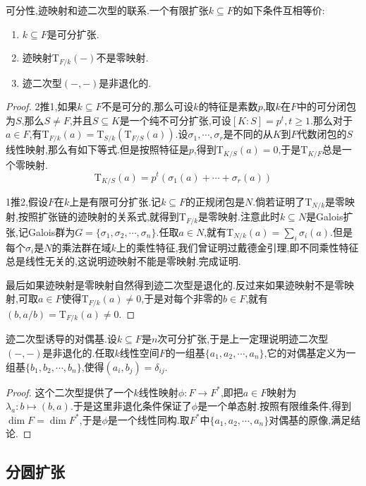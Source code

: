 可分性,迹映射和迹二次型的联系.一个有限扩张$k\subseteq F$的如下条件互相等价:
\begin{enumerate}
	\item $k\subseteq F$是可分扩张.
	\item 迹映射$\mathrm{T}_{F/k}(-)$不是零映射.
	\item 迹二次型$(-,-)$是非退化的.
\end{enumerate}
\begin{proof}

2推1,如果$k\subseteq F$不是可分的,那么可设$k$的特征是素数$p$,取$k$在$F$中的可分闭包为$S$,那么$S\not=F$,并且$S\subseteq K$是一个纯不可分扩张,可设$[K:S]=p^t,t\ge1$.那么对于$a\in F$,有$\mathrm{T}_{F/k}(a)=\mathrm{T}_{S/k}(\mathrm{T}_{F/S}(a))$.设$\sigma_1,\cdots,\sigma_r$是不同的从$K$到$F$代数闭包的$S$线性映射,那么有如下等式.但是按照特征是$p$,得到$\mathrm{T}_{K/S}(a)=0$,于是$\mathrm{T}_{K/F}$总是一个零映射.
$$\mathrm{T}_{K/S}(a)=p^t(\sigma_1(a)+\cdots+\sigma_r(a))$$

1推2,假设$F$在$k$上是有限可分扩张.记$k\subseteq F$的正规闭包是$N$.倘若证明了$\mathrm{T}_{N/k}$是零映射,按照扩张链的迹映射的关系式,就得到$\mathrm{T}_{F/k}$是零映射.注意此时$k\subseteq N$是Galois扩张,记Galois群为$G=\{\sigma_1,\sigma_2,\cdots,\sigma_n\}$.任取$a\in N$,就有$\mathrm{T}_{N/k}(a)=\sum_i\sigma_i(a)$.但是每个$\sigma_i$是$N$的乘法群在域$k$上的乘性特征,我们曾证明过戴德金引理,即不同乘性特征总是线性无关的,这说明迹映射不能是零映射.完成证明.

最后如果迹映射是零映射自然得到迹二次型是退化的.反过来如果迹映射不是零映射,可取$a\in F$使得$\mathrm{T}_{F/k}(a)\not=0$,于是对每个非零的$b\in F$,就有$(b,a/b)=\mathrm{T}_{F/k}(a)\not=0$.
\end{proof}

迹二次型诱导的对偶基.设$k\subseteq F$是$n$次可分扩张,于是上一定理说明迹二次型$(-,-)$是非退化的.任取$k$线性空间$F$的一组基$\{a_1,a_2,\cdots,a_n\}$,它的对偶基定义为一组基$\{b_1,b_2,\cdots,b_n\}$,使得$(a_i,b_j)=\delta_{ij}$.
\begin{proof}
	
	这个二次型提供了一个$k$线性映射$\phi:F\to F^*$,即把$a\in F$映射为$\lambda_a:b\mapsto(b,a)$.于是这里非退化条件保证了$\phi$是一个单态射.按照有限维条件,得到$\dim F=\dim F^*$,于是$\phi$是一个线性同构.取$F^*$中$\{a_1,a_2,\cdots,a_n\}$对偶基的原像,满足结论.
\end{proof}
\newpage
\subsection{分圆扩张}

